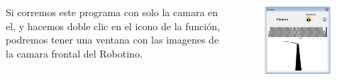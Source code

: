 \begin{frame}
	\begin{columns}
		Si corremos este programa con solo la camara en el, y hacemos doble clic en el icono de la función, podremos tener una ventana con las imagenes de la camara frontal del Robotino.

		\begin{figure}
			\begin{center}
				\includegraphics[width=0.95\textwidth]{images/01-vision-artificial/02.png}
			\end{center}
		\end{figure}
	\end{columns}
\end{frame}


